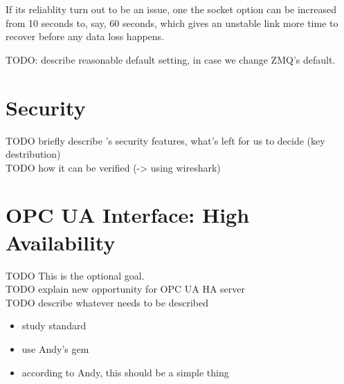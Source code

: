 If its reliablity turn out to be an issue, one the socket option
 can be increased from 10 seconds to, say, 60 seconds, which
gives an unstable link more time to recover before any data loss happens.

TODO: describe reasonable default setting, in case we change ZMQ's default.


\section{Security}\label{sec:meth:security}
TODO briefly describe \zmq's security features, what's left for us to decide (key destribution)\\
TODO how it can be verified (-> using wireshark)\\




\section{OPC UA Interface: High Availability}\label{sec:meth:opc-ua}
TODO This is the optional goal.\\
TODO explain new opportunity for OPC UA HA server\\
TODO describe whatever needs to be described\\

\begin{itemize}
	\item study standard
	\item use Andy's gem
	\item according to Andy, this should be a simple thing
\end{itemize}

